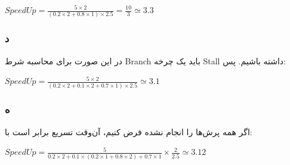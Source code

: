\setLTR
$
SpeedUp = \frac{5\times2}{(0.2\times2 + 0.8\times1)\times2.5} = \frac{10}{3} 
\simeq 3.3
$
\setRTL

\subsubsection*{د}

در این صورت برای محاسبه شرط Branch باید یک چرخه Stall داشته باشیم. پس:

\setLTR
$
SpeedUp = \frac{5\times2}{(0.2\times2 + 0.1\times2+0.7\times1)\times2.5} \simeq 3.1
$
\setRTL

\pagebreak

\subsubsection*{ه}

اگر همه پرش‌ها را انجام نشده فرض کنیم، آن‌وقت تسریع برابر است با:

\setLTR
$
SpeedUp = \frac{5}{0.2\times2+0.1\times(0.2\times1+0.8\times2)+0.7\times1} \times \frac{2}{2.5} \simeq 3.12
$
\setRTL


